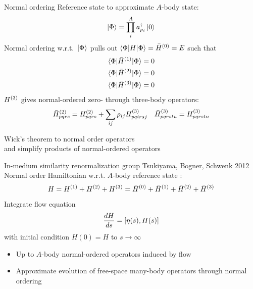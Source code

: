 \documentclass{beamer}
\begin{document}
  \begin{frame}{Normal ordering}
    Reference state to approximate $A$-body state:
    \begin{equation*}
      \ket{\Phi} = \prod_{i}^A a_{p_i}^{\dagger} \ket{0}
    \end{equation*}
    Normal ordering w.r.t.\ $\ket{\Phi}$ pulls out $\braket{\Phi|H|\Phi}={\bar{H}}^{(0)}=E$ such that
    \begin{align*}
      \braket{\Phi | {\bar{H}}^{(1)} | \Phi} &= 0\\
      \braket{\Phi | {\bar{H}}^{(2)} | \Phi} &= 0\\
      \braket{\Phi | {\bar{H}}^{(3)} | \Phi} &= 0
    \end{align*}
    ${H}^{(3)}$ gives normal-ordered zero- through three-body operators:
    \begin{align*}
      &{\bar{H}}^{(2)}_{pqrs} = {H}^{(2)}_{pqrs} + \sum_{ij} \rho_{ij} {H}^{(3)}_{pqirsj}
      &{\bar{H}}^{(3)}_{pqrstu} = {H}^{(3)}_{pqrstu}
    \end{align*}


    Wick's theorem to normal order operators \\
    and simplify products of normal-ordered operators
  \end{frame}

  \begin{frame}{In-medium similarity renormalization group {\tiny Tsukiyama, Bogner, Schwenk 2012}}
    Normal order Hamiltonian w.r.t. $A$-body reference state :
    \begin{equation*}
      H = {H}^{(1)} + {H}^{(2)} + {H}^{(3)} = {\bar{H}}^{(0)} + {\bar{H}}^{(1)} + {\bar{H}}^{(2)} + {\bar{H}}^{(3)}
    \end{equation*}
    Integrate flow equation
    \begin{equation*}
      \frac{dH}{ds} = [\eta(s), H(s)]
    \end{equation*}
    with initial condition $H(0)=H$ to $s\rightarrow\infty$
    \begin{itemize}
      \item{Up to $A$-body normal-ordered operators induced by flow}
      \item{Approximate evolution of free-space many-body operators through normal ordering}
    \end{itemize}
  \end{frame}
\end{document}
